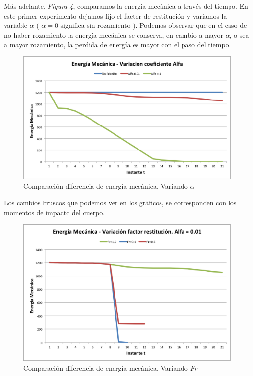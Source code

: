 \documentclass[a4paper]{article}
\begin{document}
	
Más adelante, \textit{Figura 4}, comparamos la energía mecánica a través del tiempo. En este primer experimento dejamos fijo el factor de restitución y variamos la variable $\alpha$  ( $\alpha = 0$ significa sin rozamiento ). Podemos observar que en el caso de no haber rozamiento la energía mecánica se conserva, en cambio a mayor $\alpha$, o sea a mayor rozamiento, la perdida de energía es mayor con el paso del tiempo. \\

\begin{figure}[H]
  \centering
  \includegraphics[scale=0.75]{graficos/4-energiaMecanica-alpha.png}
  \caption{Comparación diferencia de energía mecánica. Variando $\alpha$ }
\end{figure}

Los cambios bruscos que podemos ver en los gráficos, se corresponden con los momentos de impacto del cuerpo.

\begin{figure}[H]
  \centering
  \includegraphics[scale=0.75]{graficos/5-energiaMecanica-fr.png}
  \caption{Comparación diferencia de energía mecánica. Variando \textit{Fr} }
\end{figure}
 	
\end{document}
